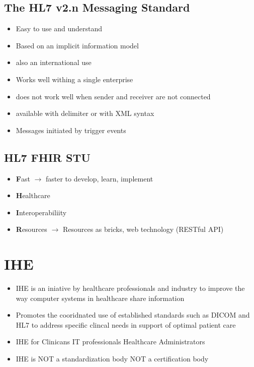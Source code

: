 \documentclass{report}
\theoremstyle{definition}
\theoremstyle{example}
\begin{document}
\section{The HL7 v2.n Messaging Standard}
\begin{itemize}
   \item Easy to use and understand
   \item Based on an implicit information model
   \item also an international use
   \item Works well withing a single enterprise
   \item does not work well when sender and receiver are not connected
   \item available with delimiter or with XML syntax
   \item Messages initiated by trigger events
\end{itemize}

\section{HL7 FHIR STU}
\begin{itemize}
   \item \textbf{F}ast $\rightarrow$ faster to develop, learn, implement
   \item \textbf{H}ealthcare
   \item \textbf{I}nteroperabiliity
   \item \textbf{R}esources $\rightarrow$ Resources as bricks, web technology (RESTful API)
\end{itemize}

\chapter{IHE}
\begin{itemize}
   \item IHE is an iniative by healthcare professionals and industry to improve the way computer systems in healthcare share information
   \item Promotes the cooridnated use of established standards such as DICOM and HL7 to address specific clincal needs in support of optimal patient care
   \item IHE for
   \subitem Clinicans
   \subitem IT professionals
   \subitem Healthcare Administrators
   \item IHE is
   \subitem NOT a standardization body
   \subitem NOT a certification body 
\end{itemize}
\end{document}
